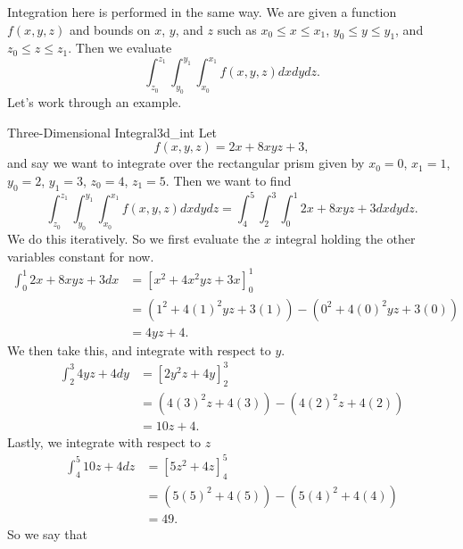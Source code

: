              	        Integration here is performed in the same way.  We are given a function $f(x,y,z)$ and bounds on $x$, $y$, and $z$ such as $x_0\leq x \leq x_1$, $y_0\leq y\leq y_1$, and $z_0\leq z \leq z_1$. Then we evaluate
             	        \[
             	        \int_{z_0}^{z_1}\int_{y_0}^{y_1}\int_{x_0}^{x_1} f(x,y,z)dxdydz.
             	        \]
             	        Let's work through an example.
             	        
             	        \begin{ex}{Three-Dimensional Integral}{3d_int}
             	        Let
             	        \[
             	        f(x,y,z)=2x + 8xyz + 3,
             	        \]
             	        and say we want to integrate over the rectangular prism given by $x_0 = 0$, $x_1=1$, $y_0=2$, $y_1=3$, $z_0 =4$, $z_1=5$.  Then we want to find
             	        \[
             	        \int_{z_0}^{z_1}\int_{y_0}^{y_1}\int_{x_0}^{x_1} f(x,y,z)dxdydz = \int_4^5 \int_2^3 \int_0^1 2x+8xyz+3dxdydz.
             	        \]
             	        We do this iteratively.  So we first evaluate the $x$ integral holding the other variables constant for now.
             	        \begin{align*}
             	            \int_0^1 2x+8xyz+3 dx &= \left[ x^2 + 4x^2yz+3x\right]_0^1\\
             	            &= \left( 1^2 + 4(1)^2yz+3(1)\right) - \left( 0^2+4(0)^2yz+3(0)\right)\\
             	            &= 4yz+4.
             	        \end{align*}
             	        We then take this, and integrate with respect to $y$.
             	        \begin{align*}
             	            \int_2^3 4yz + 4 dy &= \left[ 2y^2z+4y\right]_2^3\\
             	            &= (4(3)^2z+4(3))-(4(2)^2z+4(2))\\
             	            &= 10z+4.
             	        \end{align*}
             	        Lastly, we integrate with respect to $z$
             	        \begin{align*}
             	            \int_4^5 10z+4 dz &= \left[ 5z^2+4z\right]_4^5\\
             	            &= (5(5)^2+4(5))-(5(4)^2+4(4))\\
             	            &=49.
             	        \end{align*}
             	        So we say that

\end{ex}
